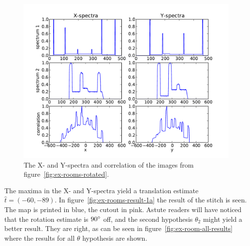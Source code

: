 \begin{figure}[ht]
	\centering
	\includegraphics[width=\textwidth]{images/stitching/rooms-ex-xy-corr.pdf}
	\caption{The X- and Y-spectra and correlation of the images from figure~\ref{fig:ex-rooms-rotated}.}
	\label{fig:ex-rooms-spectra}
\end{figure}

The maxima in the X- and Y-spectra yield a translation estimate $\hat t = (-60, -89)$. In figure~\ref{fig:ex-rooms-result-1a} the result of the stitch is seen. The map is printed in blue, the cutout in pink. Astute readers will have noticed that the rotation estimate is $90\degree$ off, and the second hypothesis $\theta_{2}$ might yield a better result. They are right, as can be seen in figure~\ref{fig:ex-room-all-results} where the results for all $\theta$ hypothesis are shown.



